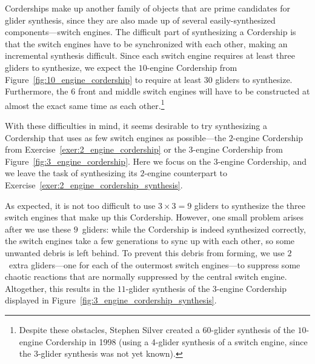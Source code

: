 Corderships make up another family of objects that are prime candidates for glider synthesis, since they are also made up of several easily-synthesized components---switch engines. The difficult part of synthesizing a Cordership is that the switch engines have to be synchronized with each other, making an incremental synthesis difficult. Since each switch engine requires at least three gliders to synthesize, we expect the $10$-engine Cordership from Figure~\ref{fig:10_engine_cordership} to require at least $30$ gliders to synthesize. Furthermore, the $6$ front and middle switch engines will have to be constructed at almost the exact same time as each other.\footnote{Despite these obstacles, Stephen Silver created a $60$-glider synthesis of the $10$-engine Cordership in 1998 (using a 4-glider synthesis of a switch engine, since the 3-glider synthesis was not yet known).}

With these difficulties in mind, it seems desirable to try synthesizing a Cordership that uses as few switch engines as possible---the $2$-engine Cordership from Exercise~\ref{exer:2_engine_cordership} or the $3$-engine Cordership from Figure~\ref{fig:3_engine_cordership}. Here we focus on the $3$-engine Cordership, and we leave the task of synthesizing its $2$-engine counterpart to Exercise~\ref{exer:2_engine_cordership_synthesis}.

As expected, it is not too difficult to use $3 \times 3 = 9$ gliders to synthesize the three switch engines that make up this Cordership. However, one small problem arises after we use these $9$~gliders: while the Cordership is indeed synthesized correctly, the switch engines take a few generations to sync up with each other, so some unwanted debris is left behind. To prevent this debris from forming, we use $2$~extra gliders---one for each of the outermost switch engines---to suppress some chaotic reactions that are normally suppressed by the central switch engine. Altogether, this results in the $11$-glider synthesis of the $3$-engine Cordership displayed in Figure~\ref{fig:3_engine_cordership_synthesis}.

